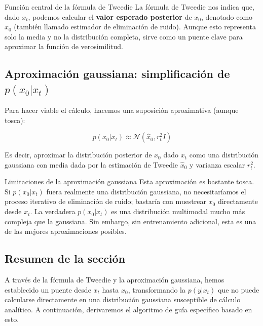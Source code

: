 \begin{importantbox}{Función central de la fórmula de Tweedie}
La fórmula de Tweedie nos indica que, dado $x_t$, podemos calcular el \textbf{valor esperado posterior} de $x_0$, denotado como $\hat{x}_0$ (también llamado estimador de eliminación de ruido). Aunque esto representa solo la media y no la distribución completa, sirve como un puente clave para aproximar la función de verosimilitud.
\end{importantbox}

\subsection{Aproximación gaussiana: simplificación de $p(x_0 | x_t)$}

Para hacer viable el cálculo, hacemos una suposición aproximativa (aunque tosca):

$$
p(x_0 | x_t) \approx \mathcal{N}(\hat{x}_0, r_t^2 I)
$$

Es decir, aproximar la distribución posterior de $x_0$ dado $x_t$ como una distribución gaussiana con media dada por la estimación de Tweedie $\hat{x}_0$ y varianza escalar $r_t^2$.

\begin{warningbox}{Limitaciones de la aproximación gaussiana}
Esta aproximación es bastante tosca. Si $p(x_0|x_t)$ fuera realmente una distribución gaussiana, no necesitaríamos el proceso iterativo de eliminación de ruido; bastaría con muestrear $x_0$ directamente desde $x_t$. La verdadera $p(x_0|x_t)$ es una distribución multimodal mucho más compleja que la gaussiana. Sin embargo, sin entrenamiento adicional, esta es una de las mejores aproximaciones posibles.
\end{warningbox}

\subsection{Resumen de la sección}

A través de la fórmula de Tweedie y la aproximación gaussiana, hemos establecido un puente desde $x_t$ hasta $x_0$, transformando la $p(y|x_t)$ que no puede calcularse directamente en una distribución gaussiana susceptible de cálculo analítico. A continuación, derivaremos el algoritmo de guía específico basado en esto.




